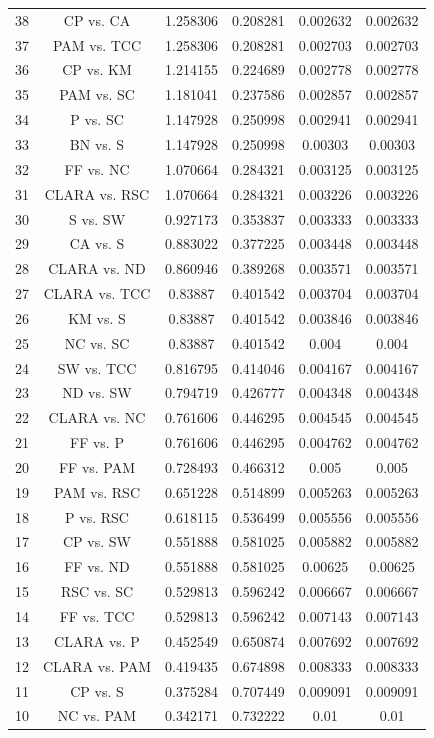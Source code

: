 \documentclass[a4paper,10pt]{article}
\begin{document}
\begin{landscape}
\begin{table}[!htp]
\begin{tabular}{cccccc}
38&CP vs. CA&1.258306&0.208281&0.002632&0.002632\\
37&PAM vs. TCC&1.258306&0.208281&0.002703&0.002703\\
36&CP vs. KM&1.214155&0.224689&0.002778&0.002778\\
35&PAM vs. SC&1.181041&0.237586&0.002857&0.002857\\
34&P vs. SC&1.147928&0.250998&0.002941&0.002941\\
33&BN vs. S&1.147928&0.250998&0.00303&0.00303\\
32&FF vs. NC&1.070664&0.284321&0.003125&0.003125\\
31&CLARA vs. RSC&1.070664&0.284321&0.003226&0.003226\\
30&S vs. SW&0.927173&0.353837&0.003333&0.003333\\
29&CA vs. S&0.883022&0.377225&0.003448&0.003448\\
28&CLARA vs. ND&0.860946&0.389268&0.003571&0.003571\\
27&CLARA vs. TCC&0.83887&0.401542&0.003704&0.003704\\
26&KM vs. S&0.83887&0.401542&0.003846&0.003846\\
25&NC vs. SC&0.83887&0.401542&0.004&0.004\\
24&SW vs. TCC&0.816795&0.414046&0.004167&0.004167\\
23&ND vs. SW&0.794719&0.426777&0.004348&0.004348\\
22&CLARA vs. NC&0.761606&0.446295&0.004545&0.004545\\
21&FF vs. P&0.761606&0.446295&0.004762&0.004762\\
20&FF vs. PAM&0.728493&0.466312&0.005&0.005\\
19&PAM vs. RSC&0.651228&0.514899&0.005263&0.005263\\
18&P vs. RSC&0.618115&0.536499&0.005556&0.005556\\
17&CP vs. SW&0.551888&0.581025&0.005882&0.005882\\
16&FF vs. ND&0.551888&0.581025&0.00625&0.00625\\
15&RSC vs. SC&0.529813&0.596242&0.006667&0.006667\\
14&FF vs. TCC&0.529813&0.596242&0.007143&0.007143\\
13&CLARA vs. P&0.452549&0.650874&0.007692&0.007692\\
12&CLARA vs. PAM&0.419435&0.674898&0.008333&0.008333\\
11&CP vs. S&0.375284&0.707449&0.009091&0.009091\\
10&NC vs. PAM&0.342171&0.732222&0.01&0.01\\

\end{tabular}
\end{table}
\end{landscape}
\end{document}

